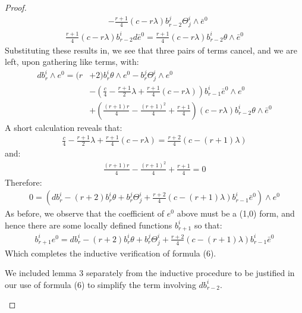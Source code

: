 \begin{proof}
\begin{align*}
&- \frac{r+1}{4} (c - r \lambda) b^j_{r-2} \Theta^i_j \wedge \bar{e}^0
\end{align*}
%
\begin{align*}
\frac{r+1}{4} (c - r \lambda) b^i_{r-2} d \bar{e}^0 = \frac{r+1}{4} (c - r \lambda) b^i_{r-2} \theta \wedge \bar{e}^0
\end{align*}
%
Substituting these results in, we see that three pairs of terms cancel, and we are left, upon gathering like terms, with:
%
\begin{align*}
d b^i_r \wedge e^0 = (r &+ 2) b^i_r \theta \wedge e^0 - b^j_r \Theta^i_j \wedge e^0 \\
&- \left( \frac{c}{4} - \frac{r+1}{2} \lambda + \frac{r+1}{4} (c - r \lambda) \right) b^i_{r-1} \bar{e}^0 \wedge e^0 \\
&+ \left( \frac{ (r+1)r }{4} - \frac{ (r+1)^2 }{4} + \frac{r+1}{4} \right) (c - r \lambda) b^i_{r-2} \theta \wedge \bar{e}^0
\end{align*}
%
A short calculation reveals that:
%
\begin{align*}
\frac{c}{4} - \frac{r+1}{2} \lambda + \frac{r+1}{4} (c - r \lambda) = \frac{r+2}{4}(c - (r+1) \lambda)
\end{align*}
%
and:
%
\begin{align*}
\frac{ (r+1)r }{4} - \frac{ (r+1)^2 }{4} + \frac{r+1}{4} = 0
\end{align*}
%
Therefore:
%
\begin{align*}
0 = \left( d b^i_r - (r + 2) b^i_r \theta + b^j_r \Theta^i_j +  \frac{r+2}{4}(c - (r+1) \lambda ) b^i_{r-1} \bar{e}^0 \right) \wedge e^0
\end{align*}
%
As before, we observe that the coefficient of $e^0$ above must be a (1,0) form, and hence there are some locally defined functions $b^i_{r+1}$ so that:
%
\begin{align*}
b^i_{r+1} e^0 = d b^i_r - (r + 2) b^i_r \theta + b^j_r \Theta^i_j +  \frac{r+2}{4}(c - (r+1) \lambda ) b^i_{r-1} \bar{e}^0
\end{align*}
%
Which completes the inductive verification of formula (6).

\begin{remark}  We included lemma 3 separately from the inductive procedure to be justified in our use of formula (6) to simplify the term involving $d b^i_{r-2}$.
\end{remark}
%
\bigskip


\end{proof}
